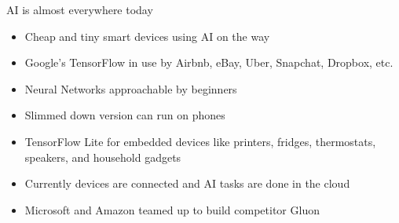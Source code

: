 \documentclass{beamer}
\begin{document}
\begin{frame}{AI is almost everywhere today}
\begin{itemize}
\item Cheap and tiny smart devices using AI on the way
\item Google's TensorFlow in use by Airbnb, eBay, Uber, Snapchat, Dropbox, etc.
\item Neural Networks approachable by beginners
\item Slimmed down version can run on phones
\item TensorFlow Lite for embedded devices like printers, fridges, thermostats, speakers, and household gadgets
\item Currently devices are connected and AI tasks are done in the cloud
\item Microsoft and Amazon teamed up to build competitor Gluon
\end{itemize}
\end{frame}
\end{document}
